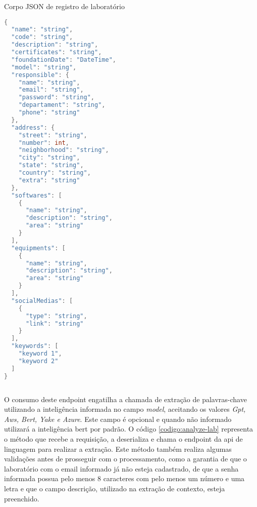 \begin{sourcecode}[H]
  \caption{\label{codigo:register-lab}Corpo JSON de registro de laboratório}
  \begin{lstlisting}[frame=single, language=Java]
{
  "name": "string",
  "code": "string",
  "description": "string",
  "certificates": "string",
  "foundationDate": "DateTime",
  "model": "string",
  "responsible": {
    "name": "string",
    "email": "string",
    "password": "string",
    "departament": "string",
    "phone": "string"
  },
  "address": {
    "street": "string",
    "number": int,
    "neighborhood": "string",
    "city": "string",
    "state": "string",
    "country": "string",
    "extra": "string"
  },
  "softwares": [
    {
      "name": "string",
      "description": "string",
      "area": "string"
    }
  ],
  "equipments": [
    {
      "name": "string",
      "description": "string",
      "area": "string"
    }
  ],
  "socialMedias": [
    {
      "type": "string",
      "link": "string"
    }
  ],
  "keywords": [
    "keyword 1",
    "keyword 2"
  ]
}
\end{lstlisting}
  \fonte{}
\end{sourcecode}

O consumo deste endpoint engatilha a chamada de extração de palavras-chave utilizando a inteligência informada no campo \textit{model}, aceitando os valores \textit{Gpt, Aws, Bert, Yake e Azure}. Este campo é opcional e quando não informado utilizará a inteligência \gls{bert} por padrão. O código \ref{codigo:analyze-lab} representa o método que recebe a requisição, a deserializa e chama o endpoint da \gls{api} de linguagem para realizar a extração. Este método também realiza algumas validações antes de prosseguir com o processamento, como a garantia de que o laboratório com o email informado já não esteja cadastrado, de que a senha informada possua pelo menos 8 caracteres com pelo menos um número e uma letra e que o campo descrição, utilizado na extração de contexto, esteja preenchido.

